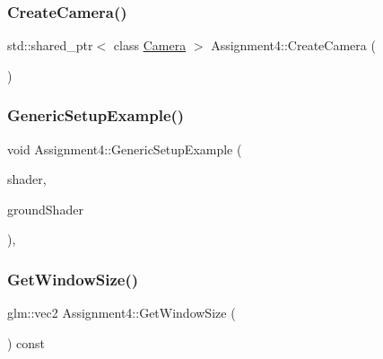 \hypertarget{class_assignment4_af75a5deee12f42e4efac2c8857c7eb05}{}\label{class_assignment4_af75a5deee12f42e4efac2c8857c7eb05} 
\subsubsection{\texorpdfstring{Create\+Camera()}{CreateCamera()}}
{\footnotesize\ttfamily std\+::shared\+\_\+ptr$<$ class \hyperlink{class_camera}{Camera} $>$ Assignment4\+::\+Create\+Camera (\begin{DoxyParamCaption}{ }\end{DoxyParamCaption})\hspace{0.3cm}{\ttfamily [static]}}

\hypertarget{class_assignment4_a440d520fc872a49fade29aa1eb7643d0}{}\label{class_assignment4_a440d520fc872a49fade29aa1eb7643d0} 
\subsubsection{\texorpdfstring{Generic\+Setup\+Example()}{GenericSetupExample()}}
{\footnotesize\ttfamily void Assignment4\+::\+Generic\+Setup\+Example (\begin{DoxyParamCaption}\item[{std\+::shared\+\_\+ptr$<$ class \hyperlink{class_shader_program}{Shader\+Program} $>$}]{shader,  }\item[{std\+::shared\+\_\+ptr$<$ \hyperlink{class_shader_program}{Shader\+Program} $>$}]{ground\+Shader }\end{DoxyParamCaption})\hspace{0.3cm}{\ttfamily [private]}, {\ttfamily [virtual]}}

\hypertarget{class_assignment4_ad197b75e730f9b32458429df8d55458e}{}\label{class_assignment4_ad197b75e730f9b32458429df8d55458e} 
\subsubsection{\texorpdfstring{Get\+Window\+Size()}{GetWindowSize()}}
{\footnotesize\ttfamily glm\+::vec2 Assignment4\+::\+Get\+Window\+Size (\begin{DoxyParamCaption}{ }\end{DoxyParamCaption}) const\hspace{0.3cm}{\ttfamily [virtual]}}




